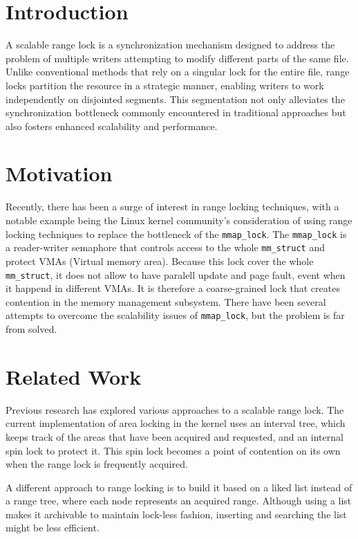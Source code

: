 \section{Introduction}

A scalable range lock is a synchronization mechanism designed to address the problem of multiple writers attempting to modify different parts of the same file. Unlike conventional methods that rely on a singular lock for the entire file, range locks partition the resource in a strategic manner, enabling writers to work independently on disjointed segments. This segmentation not only alleviates the synchronization bottleneck commonly encountered in traditional approaches but also fosters enhanced scalability and performance.

\section{Motivation}
Recently, there has been a surge of interest in range locking techniques\parencite{readerWriterLocks2017, mapleTree2021, mmapLock2022}, with a notable example being the Linux kernel community's consideration of using range locking techniques to replace the bottleneck of the \texttt{mmap\_lock}. The \texttt{mmap\_lock} is a reader-writer semaphore that controls access to the whole \texttt{mm\_struct}\parencite{mmstruct2023} and protect VMAs (Virtual memory area). Because this lock cover the whole \texttt{mm\_struct}, it does not allow to have paralell update and page fault, event when it happend in different VMAs. It is therefore a coarse-grained lock that creates contention in the memory management subsystem. There have been several attempts to overcome the scalability issues of \texttt{mmap\_lock}, but the problem is far from solved\parencite{mmapLock2022}.

\section{Related Work}
Previous research has explored various approaches to a scalable range lock. The current implementation of area locking in the kernel uses an interval tree, which keeps track of the areas that have been acquired and requested, and an internal spin lock to protect it. This spin lock becomes a point of contention on its own when the range lock is frequently acquired\parencite{scalableRangeLock2020}.

A different approach to range locking is to build it based on a liked list instead of a range tree, where each node represents an acquired range\parencite{scalableRangeLock2020}. Although using a list makes it archivable to maintain lock-less fashion, inserting and searching the list might be less efficient.

